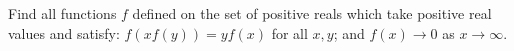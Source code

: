 Find all functions $f$ defined on the set of positive reals which take positive real values and satisfy: $f(xf(y))=yf(x)$ for all $x,y$; and $f(x)\to0$ as $x\to\infty$.